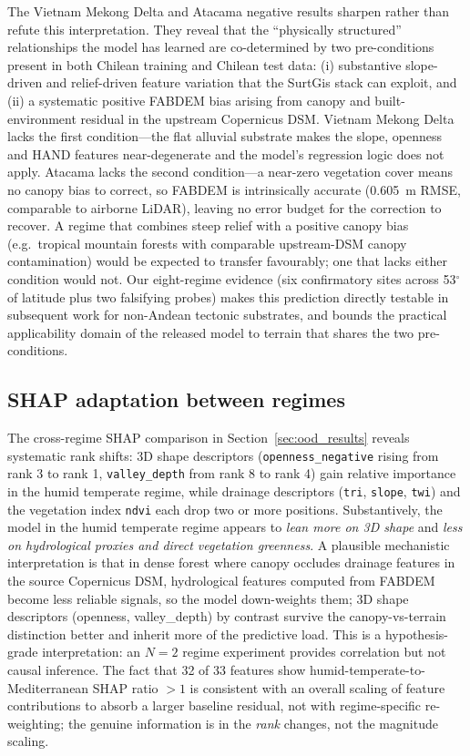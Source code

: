 \documentclass[preprint,authoryear,number]{elsarticle}
\begin{document}
The Vietnam Mekong Delta and Atacama negative results sharpen rather than refute this interpretation. They reveal that the ``physically structured'' relationships the model has learned are co-determined by two pre-conditions present in both Chilean training and Chilean test data: (i) substantive slope-driven and relief-driven feature variation that the SurtGis stack can exploit, and (ii) a systematic positive FABDEM bias arising from canopy and built-environment residual in the upstream Copernicus DSM. Vietnam Mekong Delta lacks the first condition---the flat alluvial substrate makes the slope, openness and HAND features near-degenerate and the model's regression logic does not apply. Atacama lacks the second condition---a near-zero vegetation cover means no canopy bias to correct, so FABDEM is intrinsically accurate (\SI{0.605}{\meter} RMSE, comparable to airborne LiDAR), leaving no error budget for the correction to recover. A regime that combines steep relief with a positive canopy bias (e.g.\ tropical mountain forests with comparable upstream-DSM canopy contamination) would be expected to transfer favourably; one that lacks either condition would not. Our eight-regime evidence (six confirmatory sites across 53$^{\circ}$ of latitude plus two falsifying probes) makes this prediction directly testable in subsequent work for non-Andean tectonic substrates, and bounds the practical applicability domain of the released model to terrain that shares the two pre-conditions.

\subsection{SHAP adaptation between regimes}
\label{sec:shap_discussion}

The cross-regime SHAP comparison in Section~\ref{sec:ood_results} reveals systematic rank shifts: 3D shape descriptors (\texttt{openness\_negative} rising from rank 3 to rank 1, \texttt{valley\_depth} from rank 8 to rank 4) gain relative importance in the humid temperate regime, while drainage descriptors (\texttt{tri}, \texttt{slope}, \texttt{twi}) and the vegetation index \texttt{ndvi} each drop two or more positions. Substantively, the model in the humid temperate regime appears to \emph{lean more on 3D shape} and \emph{less on hydrological proxies and direct vegetation greenness}. A plausible mechanistic interpretation is that in dense forest where canopy occludes drainage features in the source Copernicus DSM, hydrological features computed from FABDEM become less reliable signals, so the model down-weights them; 3D shape descriptors (openness, valley\_depth) by contrast survive the canopy-vs-terrain distinction better and inherit more of the predictive load. This is a hypothesis-grade interpretation: an $N = 2$ regime experiment provides correlation but not causal inference. The fact that 32 of 33 features show humid-temperate-to-Mediterranean SHAP ratio $> 1$ is consistent with an overall scaling of feature contributions to absorb a larger baseline residual, not with regime-specific re-weighting; the genuine information is in the \emph{rank} changes, not the magnitude scaling.
\end{document}
